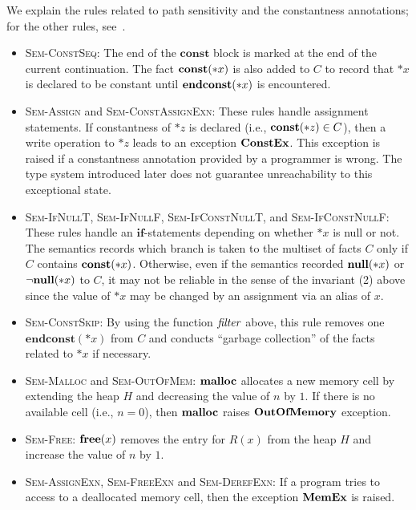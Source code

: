 We explain the rules related to path sensitivity and the constantness
annotations; for the other rules, see~\cite{tanPPL2015}.
\begin{itemize}
\item \textsc{Sem-ConstSeq}: The end of the $\mathbf{const}$ block is
      marked at the end of the current continuation.  The fact
      $\mathbf{const}(*x)$ is also added to $C$ to record that $*x$ is declared
      to be constant until $\mathbf{endconst}(*x)$ is encountered.
\item \textsc{Sem-Assign} and \textsc{Sem-ConstAssignExn}: These rules
      handle assignment statements.  If constantness of $*z$ is declared
      (i.e., $\mathbf{const}(*z) \in C$), then a write operation to $*z$ leads
      to an exception $\mathbf{ConstEx}$.  This exception is raised if a
      constantness annotation provided by a programmer is wrong.  The
      type system introduced later does not guarantee unreachability to
      this exceptional state.
\item \textsc{Sem-IfNullT}, \textsc{Sem-IfNullF},
  \textsc{Sem-IfConstNullT}, and \textsc{Sem-IfConstNullF}: These
  rules handle an $\mathbf{if}$-statements depending on whether $*x$
  is null or not.  The semantics records which branch is taken to the
  multiset of facts $C$ only if $C$ contains $\mathbf{const}(*x)$.  Otherwise,
  even if the semantics recorded $\mathbf{null}(*x)$ or $\neg\mathbf{null}(*x)$ to $C$, it may
  not be reliable in the sense of the invariant (2) above since the
  value of $*x$ may be changed by an assignment via an alias of $x$.
\item \textsc{Sem-ConstSkip}: By using the function $\mathit{filter}$ above,
      this rule removes one $\mathbf{endconst}(*x)$ from $C$ and
      conducts ``garbage collection'' of the facts related to $*x$ if
      necessary.
\item \textsc{Sem-Malloc} and \textsc{Sem-OutOfMem}: $\mathbf{malloc}$ allocates
      a new memory cell by extending the heap $H$ and decreasing the
      value of $n$ by $1$.  If there is no available cell (i.e., $n =
      0$), then $\mathbf{malloc}$ raises $\mathbf{OutOfMemory}$ exception.
\item \textsc{Sem-Free}: $\mathbf{free}(x)$ removes the entry for $R(x)$ from
      the heap $H$ and increase the value of $n$ by $1$.
\item \textsc{Sem-AssignExn}, \textsc{Sem-FreeExn} and
      \textsc{Sem-DerefExn}: If a program tries to access to a
      deallocated memory cell, then the exception $\mathbf{MemEx}$ is raised.
\end{itemize}

